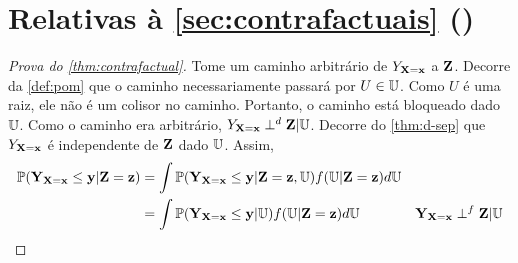 \section{Relativas à \cref{sec:contrafactuais} ()}

\begin{proof}[Prova do \cref{thm:contrafactual}]
 Tome um caminho arbitrário de $Y_{\X=\x}$ a $\Z$.
 Decorre da \cref{def:pom} que 
 o caminho necessariamente passará por $U \in \U$.
 Como $U$ é uma raiz, ele não é
 um colisor no caminho. Portanto,
 o caminho está bloqueado dado $\U$.
 Como o caminho era arbitrário,
 $Y_{\X=\x} \dsep \Z | \U$.
 Decorre do \cref{thm:d-sep} que
 $Y_{\X=\x}$ é independente de $\Z$ dado $\U$.
 Assim,
 \begin{align*}
  \P(\Y_{\X=\x} \leq \y|\Z=\z)
  &= \int \P(\Y_{\X=\x} \leq \y|\Z=\z,\U)f(\U|\Z=\z)d\U \\
  &= \int \P(\Y_{\X=\x} \leq \y|\U)f(\U|\Z=\z)d\U
  & \Y_{\X=\x} \perp^f \Z | \U
 \end{align*}
\end{proof}


